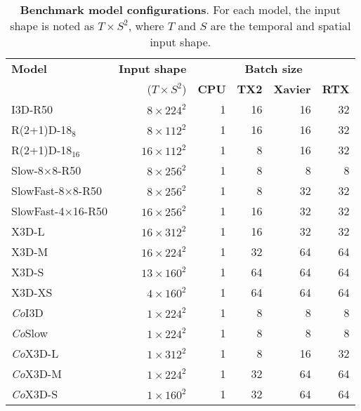 \begin{table}[!htbp]
\begin{center}
\begin{tabular}{lrrrrr}
    \toprule
    \textbf{Model} %
    &\textbf{Input shape} %
    &\multicolumn{4}{c}{\textbf{Batch size}}
        \\ \cline{3-6}
        &($T \times S^2$) &\textbf{CPU} & \textbf{TX2}  &\textbf{Xavier} &\textbf{RTX}
    \\
    \midrule
    
    I3D-R50                       & $8  \times 224^2 $      & 1       & 16      & 16       & 32     \\
    R(2+1)D-18$_8$                & $8  \times 112^2 $      & 1       & 16      & 16       & 32     \\
    R(2+1)D-18$_{16}$             & $16 \times 112^2 $      & 1       & 8       & 16       & 32     \\
    Slow-8×8-R50                  & $8  \times 256^2 $      & 1       & 8       & 8        & 8     \\ 
    SlowFast-8×8-R50              & $8  \times 256^2 $      & 1       & 8       & 32       & 32     \\ 
    SlowFast-4×16-R50             & $16 \times 256^2 $      & 1       & 16      & 32       & 32     \\ %
    X3D-L                         & $16 \times 312^2 $      & 1       & 16       & 32       & 32     \\
    X3D-M                         & $16 \times 224^2 $      & 1       & 32      & 64       & 64     \\
    X3D-S                         & $13 \times 160^2 $      & 1       & 64      & 64       & 64     \\
    X3D-XS                        & $4  \times 160^2 $      & 1       & 64      & 64       & 64     \\
    \textit{Co}I3D                & $1  \times 224^2 $      & 1       & 8       & 8        & 8     \\
    \textit{Co}Slow                & $1  \times 224^2 $      & 1       & 8       & 8        & 8     \\
    \textit{Co}X3D-L              & $1  \times 312^2 $      & 1       & 8       & 16       & 32     \\
    \textit{Co}X3D-M              & $1  \times 224^2 $      & 1       & 32      & 64       & 64     \\
    \textit{Co}X3D-S              & $1  \times 160^2 $      & 1       & 32      & 64       & 64     \\
    \bottomrule
\end{tabular}
\end{center}
\caption{
    \textbf{Benchmark model configurations}. For each model, the input shape is noted as $T \times S^2$, where $T$ and $S$ are the temporal and spatial input shape. 
}
\label{tab:benchmark-config}
\end{table}



